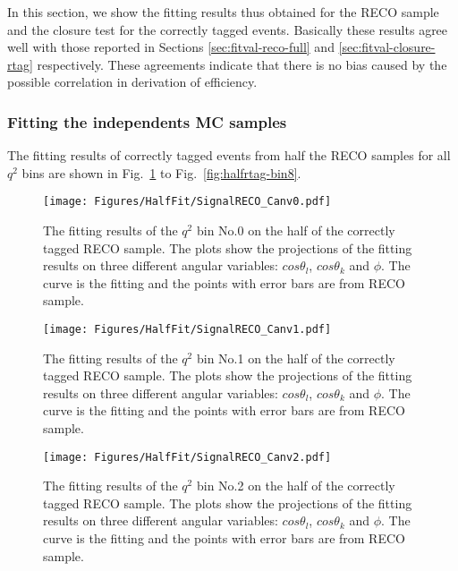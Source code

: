 In this section, we show the fitting results thus obtained for the
RECO sample and the closure test for the correctly tagged
events. Basically these results agree well with those reported in
Sections \ref{sec:fitval-reco-full} and \ref{sec:fitval-closure-rtag}
respectively. These agreements indicate that there is no bias caused
by the possible correlation in derivation of efficiency.

\subsubsection{Fitting the independents MC samples}
\label{sec:fitval-fitres-half}

The fitting results of correctly tagged events from half the RECO
samples for all $q^2$ bins are shown in Fig.~\ref{fig:halfrtag-bin0}
to Fig.~\ref{fig:halfrtag-bin8}.

\begin{figure}[!hbt]
  \centering
  \texttt{[image: Figures/HalfFit/SignalRECO\_Canv0.pdf]}
  \caption{The fitting results of the $q^2$ bin No.0 on the half of the correctly
    tagged RECO  sample. The plots show the projections of the fitting results on
    three different angular variables: $cos\theta_l$, $cos\theta_k$
    and $\phi$. The curve is the fitting and the points with error
    bars are from RECO sample. }
  \label{fig:halfrtag-bin0}
\end{figure}


\begin{figure}[!hbt]
  \centering
  \texttt{[image: Figures/HalfFit/SignalRECO\_Canv1.pdf]}
  \caption{The fitting results of the $q^2$ bin No.1 on the half of the correctly
    tagged RECO  sample. The plots show the projections of the fitting results on
    three different angular variables: $cos\theta_l$, $cos\theta_k$
    and $\phi$. The curve is the fitting and the points with error
    bars are from RECO sample. }
  \label{fig:halfrtag-bin1}
\end{figure}

\begin{figure}[!hbt]
  \centering
  \texttt{[image: Figures/HalfFit/SignalRECO\_Canv2.pdf]}
  \caption{The fitting results of the $q^2$ bin No.2 on the half of the correctly
    tagged RECO  sample. The plots show the projections of the fitting results on
    three different angular variables: $cos\theta_l$, $cos\theta_k$
    and $\phi$. The curve is the fitting and the points with error
    bars are from RECO sample. }
  \label{fig:halfrtag-bin2}
\end{figure}

